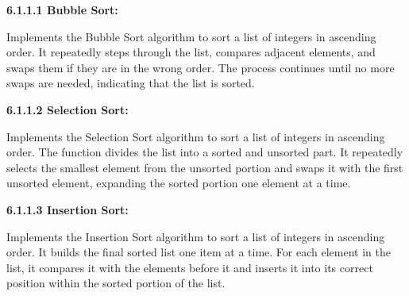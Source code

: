 
\usepackage{pdfpages}

%
%

\newcommand{\hmwkTitle}{Lab 02}
\newcommand{\hmwkDueDate}{September 29, 2024}
\newcommand{\hmwkDueTime}{11:59 PM}
\newcommand{\hmwkClass}{ENAE 380}
\newcommand{\hmwkClassTime}{0106}
\newcommand{\hmwkClassInstructor}{Dr. Mumu Xu}
\newcommand{\hmwkAuthorName}{\textbf{Vai Srivastava}}
\newcommand{\hmwkCompletionDate}{September 28, 2024}



\maketitle

\pagebreak

\begin{homeworkProblem}

	{\Large\textbf{6.1.1.1 Bubble Sort:}}

	Implements the Bubble Sort algorithm to sort a list of integers in ascending order. It repeatedly steps through the list, compares adjacent elements, and swaps them if they are in the wrong order. The process continues until no more swaps are needed, indicating that the list is sorted.

\end{homeworkProblem}

\begin{homeworkProblem}

	{\Large\textbf{6.1.1.2 Selection Sort:}}

	Implements the Selection Sort algorithm to sort a list of integers in ascending order. The function divides the list into a sorted and unsorted part. It repeatedly selects the smallest element from the unsorted portion and swaps it with the first unsorted element, expanding the sorted portion one element at a time.

\end{homeworkProblem}

\begin{homeworkProblem}

	{\Large\textbf{6.1.1.3 Insertion Sort:}}

	Implements the Insertion Sort algorithm to sort a list of integers in ascending order. It builds the final sorted list one item at a time. For each element in the list, it compares it with the elements before it and inserts it into its correct position within the sorted portion of the list.

\end{homeworkProblem}

